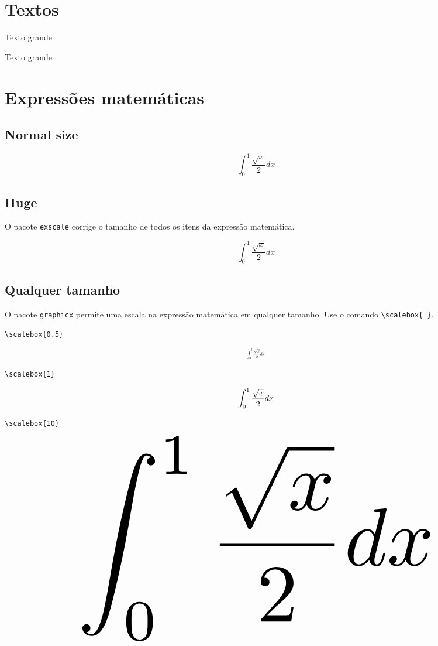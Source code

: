 \documentclass[a4paper]{article}
\begin{document}
\section*{Textos}

{\fontsize{100}{120}\selectfont Texto grande}

{\fontsize{200}{120}\selectfont Texto grande}

\newpage 

\section*{Expressões matemáticas}

\subsection*{Normal size}

\[
  \int_0^1 {\frac{\sqrt x}{2}dx}
\]

\subsection*{Huge}

O pacote \texttt{exscale} corrige o tamanho de todos os itens da expressão matemática.

{\Huge
\[
  \int_0^1 {\frac{\sqrt x}{2}dx} 
\]
}

\subsection*{Qualquer tamanho}

O pacote \texttt{graphicx} permite uma escala na expressão matemática em qualquer tamanho. Use o comando \verb|\scalebox{ }|.

\verb|\scalebox{0.5}|

\[
  \scalebox{0.5}{
    $\displaystyle\int_0^1 {\frac{\sqrt x}{2}dx}$
  }
\]

\verb|\scalebox{1}|

\[
  \scalebox{1}{
    $\displaystyle\int_0^1 {\frac{\sqrt x}{2}dx}$
  }
\]

\verb|\scalebox{10}|

\[
  \scalebox{10}{
    $\displaystyle\int_0^1 {\frac{\sqrt x}{2}dx}$
  }
\]
\end{document}
